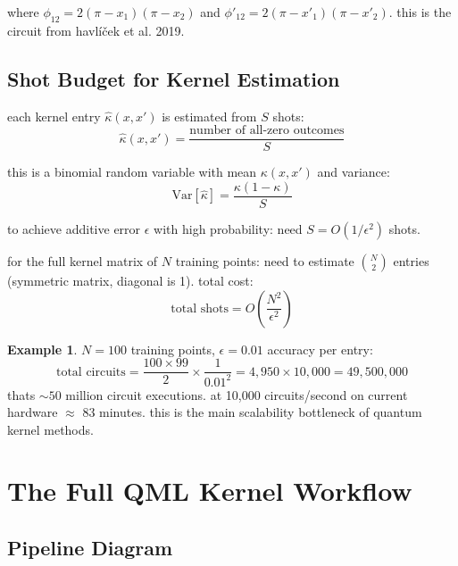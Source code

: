 \documentclass[11pt,a4paper]{article}
\theoremstyle{definition}
\newtheorem{example}{Example}[section]
\theoremstyle{remark}
\begin{document}
where $\phi_{12} = 2(\pi-x_1)(\pi-x_2)$ and $\phi'_{12} = 2(\pi-x'_1)(\pi-x'_2)$. this is the circuit from havl\'i\v{c}ek et al. 2019.

\subsection{Shot Budget for Kernel Estimation}

each kernel entry $\hat{\kappa}(x,x')$ is estimated from $S$ shots:
\[
\hat{\kappa}(x,x') = \frac{\text{number of all-zero outcomes}}{S}
\]

this is a binomial random variable with mean $\kappa(x,x')$ and variance:
\[
\text{Var}[\hat{\kappa}] = \frac{\kappa(1-\kappa)}{S}
\]

to achieve additive error $\epsilon$ with high probability: need $S = O(1/\epsilon^2)$ shots.

for the full kernel matrix of $N$ training points: need to estimate $\binom{N}{2}$ entries (symmetric matrix, diagonal is 1). total cost:
\[
\text{total shots} = O\left(\frac{N^2}{\epsilon^2}\right)
\]

\begin{example}
$N = 100$ training points, $\epsilon = 0.01$ accuracy per entry:
\[
\text{total circuits} = \frac{100 \times 99}{2} \times \frac{1}{0.01^2} = 4{,}950 \times 10{,}000 = 49{,}500{,}000
\]
thats $\sim 50$ million circuit executions. at 10,000 circuits/second on current hardware $\approx$ 83 minutes. this is the main scalability bottleneck of quantum kernel methods.
\end{example}

\section{The Full QML Kernel Workflow}

\subsection{Pipeline Diagram}
\end{document}
